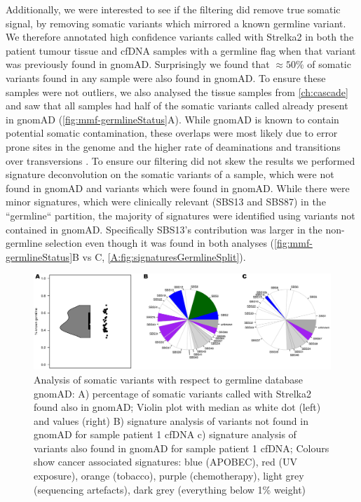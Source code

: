 Additionally, we were interested to see if the filtering did remove true somatic signal, by removing somatic variants which mirrored a known germline variant. We therefore annotated high confidence variants called with Strelka2 in both the patient tumour tissue and cfDNA samples with a germline flag when that variant was previously found in gnomAD. Surprisingly we found that $\approx 50\%$ of somatic variants found in any sample were also found in gnomAD. To ensure these samples were not outliers, we also analysed the tissue samples from \autoref{ch:cascade} and saw that all samples had half of the somatic variants called already present in gnomAD (\autoref{fig:mmf-germlineStatus}A). While gnomAD is known to contain potential somatic contamination, these overlaps were most likely due to error prone sites in the genome and the higher rate of deaminations and transitions over transversions \cite{Meyerson2020}. To ensure our filtering did not skew the results we performed signature deconvolution on the somatic variants of a sample, which were not found in gnomAD and variants which were found in gnomAD. While there were minor signatures, which were clinically relevant (SBS13 and SBS87) in the ``germline`` partition, the majority of signatures were identified using variants not contained in gnomAD. Specifically SBS13's contribution was larger in the non-germline selection even though it was found in both analyses (\autoref{fig:mmf-germlineStatus}B vs C, \autoref{A:fig:signaturesGermlineSplit}).

\begin{figure}[ht]
\centering
\includegraphics[width=.99\linewidth]{Figures/MisMatchFinder/somaticVarsInGermlineSites.pdf}
\caption[Somatic variants found in germline sites]{Analysis of somatic variants with respect to germline database gnomAD: A) percentage of somatic variants called with Strelka2 found also in gnomAD; Violin plot with median as white dot (left) and values (right)  B) signature analysis of variants not found in gnomAD for sample patient 1 cfDNA c) signature analysis of variants also found in gnomAD for sample patient 1 cfDNA; Colours show cancer associated signatures: blue (APOBEC), red (UV exposure), orange (tobacco), purple (chemotherapy), light grey (sequencing artefacts), dark grey (everything below 1\% weight)}\label{fig:mmf-germlineStatus}
\end{figure}
  


